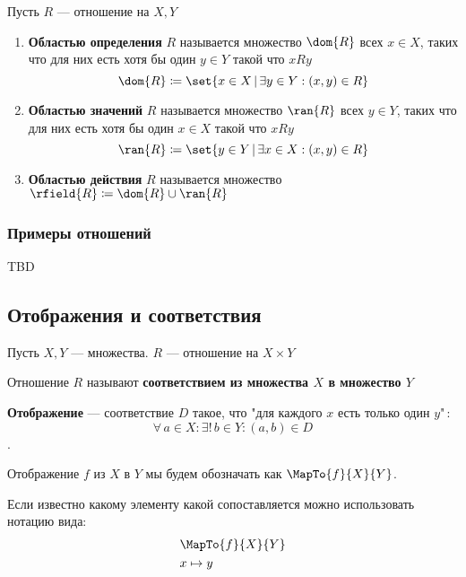 \documentclass{article}
\begin{document}
\begin{definition}
    \label{def:relation-fields}
    Пусть \(R\) --- отношение на \(X, Y\)
    \begin{enumerate}
        \item \textbf{Областью определения} \(R\) называется множество \(\dom{R}\) всех \(x \in X\), таких что для них есть хотя бы один \(y \in Y\) такой что \(x R y\) 
        \[\dom{R} \coloneq \set{x \in X\,|\, \exists y \in Y: (x, y) \in R }\]
        \item \textbf{Областью значений} \(R\) называется множество \(\ran{R}\) всех \(y \in Y\), таких что для них есть хотя бы один \(x \in X\) такой что \(x R y\)  
        \[\ran{R} \coloneq \set{y \in Y\,|\, \exists x \in X: (x, y) \in R }\]
        \item \textbf{Областью действия} \(R\) называется множество \(\rfield{R} \coloneq \dom{R} \cup \ran{R}\)
    \end{enumerate}
\end{definition}
    
\subsubsection{Примеры отношений}
    TBD 


\subsection{Отображения и соответствия}
\begin{definition}  
    \label{def:maps}
    Пусть \(X, Y\) --- множества. \(R\) --- отношение на \(X \times Y\)

    Отношение \(R\) называют \textbf{соответствием из множества \(X\) в множество \(Y\)}
    
    \textbf{Отображение} --- соответствие \(D\) такое, что "для каждого \(x\) есть только один \(y\)"\,: \[\forall\, a \in X: \exists!\, b \in Y: (a, b) \in D\].
\end{definition}
\begin{defnotation}
    Отображение \(f\) из \(X\) в \(Y\) мы будем обозначать как \(\MapTo{f}{X}{Y}\). 
    
    Если известно какому элементу какой сопоставляется можно использовать нотацию вида:
    \begin{align*}
        &\MapTo{f}{X}{Y}\\
        &x \mapsto y
    \end{align*}
\end{defnotation}
\end{document}
